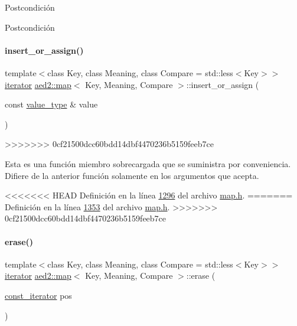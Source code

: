 \begin{DoxyPostcond}{\-Postcondición}
\begin{DoxyPostcond}{\-Postcondición}
\paragraph{\texorpdfstring{insert\+\_\+or\+\_\+assign()}{insert\_or\_assign()}\hspace{0.1cm}{\footnotesize\ttfamily [2/2]}}
{\footnotesize\ttfamily template$<$class Key, class Meaning, class Compare = std\+::less$<$\+Key$>$$>$ \\
\hyperlink{classaed2_1_1map_1_1iterator}{iterator} \hyperlink{classaed2_1_1map}{aed2\+::map}$<$ Key, Meaning, Compare $>$\+::insert\+\_\+or\+\_\+assign (\begin{DoxyParamCaption}\item[{const \hyperlink{classaed2_1_1map_a719db98e0ff9a837610f76be33264680_a719db98e0ff9a837610f76be33264680}{value\+\_\+type} \&}]{value }\end{DoxyParamCaption})\hspace{0.3cm}{\ttfamily [inline]}}
>>>>>>> 0cf21500dcc60bdd14dbf4470236b5159feeb7ce

Esta es una función miembro sobrecargada que se suministra por conveniencia. Difiere de la anterior función solamente en los argumentos que acepta. 

<<<<<<< HEAD
\-Definición en la línea \hyperlink{map_8h_source_l01296}{1296} del archivo \hyperlink{map_8h_source}{map.\-h}.
=======
Definición en la línea \hyperlink{map_8h_source_l01353}{1353} del archivo \hyperlink{map_8h_source}{map.\+h}.
>>>>>>> 0cf21500dcc60bdd14dbf4470236b5159feeb7ce

\mbox{\label{classaed2_1_1map_ad8e796bf9c9c558e5ce6b61e116253fe_ad8e796bf9c9c558e5ce6b61e116253fe}} 
\paragraph{\texorpdfstring{erase()}{erase()}\hspace{0.1cm}{\footnotesize\ttfamily [1/2]}}
{\footnotesize\ttfamily template$<$class Key, class Meaning, class Compare = std\+::less$<$\+Key$>$$>$ \\
\hyperlink{classaed2_1_1map_1_1iterator}{iterator} \hyperlink{classaed2_1_1map}{aed2\+::map}$<$ Key, Meaning, Compare $>$\+::erase (\begin{DoxyParamCaption}\item[{\hyperlink{classaed2_1_1map_1_1const__iterator}{const\+\_\+iterator}}]{pos }\end{DoxyParamCaption})\hspace{0.3cm}{\ttfamily [inline]}}




\end{DoxyPostcond}
\end{DoxyPostcond}

